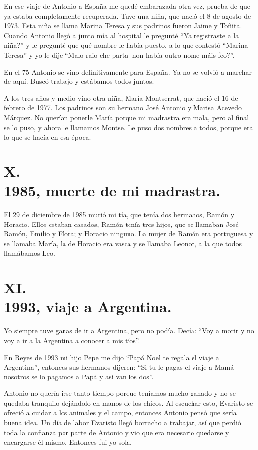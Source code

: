 \documentclass[12pt,a5paper]{book}
\begin{document}
En ese viaje de Antonio a España me quedé embarazada otra vez, prueba de que ya estaba completamente recuperada. Tuve una niña, que nació el 8 de agosto de 1973. Esta niña se llama Marina Teresa y sus padrinos fueron Jaime y Toñita. Cuando Antonio llegó a junto mía al hospital le pregunté ``Ya registraste a la niña?'' y le pregunté que qué nombre le había puesto, a lo que contestó ``Marina Teresa'' y yo le dije ``Malo raio che parta, non había outro nome máis feo?''.

En el 75 Antonio se vino definitivamente para España. Ya no se volvió a marchar de aquí. Buscó trabajo y estábamos todos juntos.

A los tres años y medio vino otra niña, María Montserrat, que nació el 16 de febrero de 1977. Los padrinos son su hermano José Antonio y Marisa Acevedo Márquez. No querían ponerle María porque mi madrastra era mala, pero al final se lo puso, y ahora le llamamos Montse. Le puso dos nombres a todos, porque era lo que se hacía en esa época.

\section*{X.\\1985, muerte de mi madrastra.}

El 29 de diciembre de 1985 murió mi tía, que tenía dos hermanos, Ramón y Horacio. Ellos estaban casados, Ramón tenía tres hijos, que se llamaban José Ramón, Emilio y Flora; y Horacio ninguno. La mujer de Ramón era portuguesa y se llamaba María, la de Horacio era vasca y se llamaba Leonor, a la que todos llamábamos Leo.

\section*{XI.\\1993, viaje a Argentina.}

Yo siempre tuve ganas de ir a Argentina, pero no podía. Decía: ``Voy a morir y no voy a ir a la Argentina a conocer a mis tíos''.
 
En Reyes de 1993 mi hijo Pepe me dijo ``Papá Noel te regala el viaje a Argentina'', entonces sus hermanos dijeron: ``Si tu le pagas el viaje a Mamá nosotros se lo pagamos a Papá y así van los dos''. 

Antonio no quería irse tanto tiempo porque teníamos mucho ganado y no se quedaba tranquilo dejándolo en manos de los chicos. Al escuchar esto, Evaristo se ofreció a cuidar a los animales y el campo, entonces Antonio pensó que sería buena idea. Un día de labor Evaristo llegó borracho a trabajar, así que perdió toda la confianza por parte de Antonio y vio que era necesario quedarse y encargarse él mismo. Entonces fui yo sola.
\end{document}
